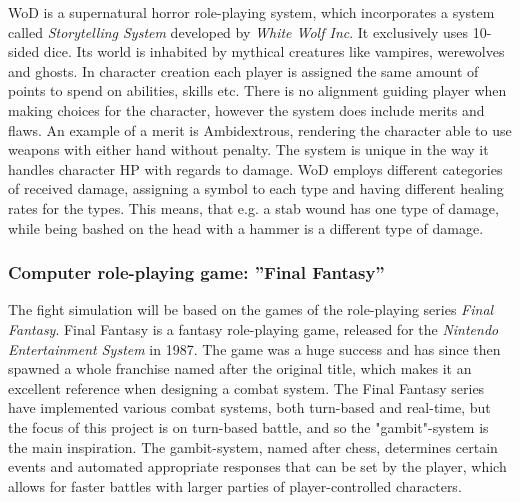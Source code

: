 WoD is a supernatural horror role-playing system, which incorporates a system called \emph{Storytelling System} developed by \emph{White Wolf Inc}. It exclusively uses 10-sided dice\cite{Appelcline2007}. Its world is inhabited by mythical creatures like vampires, werewolves and ghosts. In character creation each player is assigned the same amount of points to spend on abilities, skills etc. There is no alignment guiding player when making choices for the character, however the system does include merits and flaws. An example of a merit is Ambidextrous, rendering the character able to use weapons with either hand without penalty. The system is unique in the way it handles character HP with regards to damage. WoD employs different categories of received damage, assigning a symbol to each type and having different healing rates for the types.\cite{wod} This means, that e.g. a stab wound has one type of damage, while being bashed on the head with a hammer is a different type of damage.




\subsubsection*{Computer role-playing game: ''Final Fantasy''}
The fight simulation will be based on the games of the role-playing series \emph{Final Fantasy}. Final Fantasy is a fantasy role-playing game, released for the \emph{Nintendo Entertainment System} in 1987. The game was a huge success and has since then spawned a whole franchise named after the original title, which makes it an excellent reference when designing a combat system.
The Final Fantasy series have implemented various combat systems, both turn-based and real-time,\cite{ffantasy} but the focus of this project is on turn-based battle, and so the "gambit"-system is the main inspiration. The gambit-system, named after chess, determines certain events and automated appropriate responses that can be set by the player, which allows for faster battles with larger parties of player-controlled characters.

